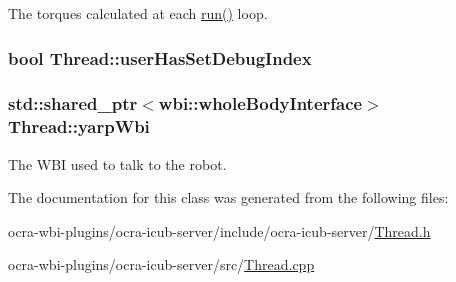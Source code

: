 \-The torques calculated at each \hyperlink{classThread_ad9373d8d725c46717dfce3130018fe3a}{run()} loop. \hypertarget{classThread_a20581ff7f2cfb2efe1fbc2aa703438a4}{
\subsubsection[{user\-Has\-Set\-Debug\-Index}]{\setlength{\rightskip}{0pt plus 5cm}bool {\bf \-Thread\-::user\-Has\-Set\-Debug\-Index}}}\label{classThread_a20581ff7f2cfb2efe1fbc2aa703438a4}
\hypertarget{classThread_aa3f4bbc2dca15c247a13de1bdbc4f7a3}{
\subsubsection[{yarp\-Wbi}]{\setlength{\rightskip}{0pt plus 5cm}std\-::shared\-\_\-ptr$<$wbi\-::whole\-Body\-Interface$>$ {\bf \-Thread\-::yarp\-Wbi}}}\label{classThread_aa3f4bbc2dca15c247a13de1bdbc4f7a3}
\-The \-W\-B\-I used to talk to the robot. 

\-The documentation for this class was generated from the following files\-:\begin{DoxyCompactItemize}
\item 
ocra-\/wbi-\/plugins/ocra-\/icub-\/server/include/ocra-\/icub-\/server/\hyperlink{Thread_8h}{\-Thread.\-h}\item 
ocra-\/wbi-\/plugins/ocra-\/icub-\/server/src/\hyperlink{Thread_8cpp}{\-Thread.\-cpp}\end{DoxyCompactItemize}
